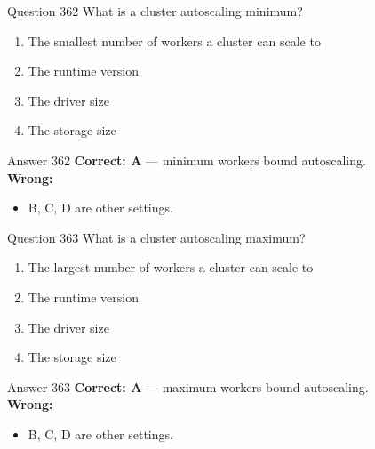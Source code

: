 \documentclass[aspectratio=169,11pt]{beamer}
\begin{document}
	\begin{frame}{Question 362}
		What is a cluster autoscaling minimum?
		\begin{enumerate}[label=\Alph*.]
			\item The smallest number of workers a cluster can scale to
			\item The runtime version
			\item The driver size
			\item The storage size
		\end{enumerate}
	\end{frame}
	\begin{frame}{Answer 362}
		\textbf{Correct: A} --- minimum workers bound autoscaling.\\
		\vspace{0.5em}
		\textbf{Wrong:}
		\begin{itemize}
			\item B, C, D are other settings.
		\end{itemize}
	\end{frame}
	
	\begin{frame}{Question 363}
		What is a cluster autoscaling maximum?
		\begin{enumerate}[label=\Alph*.]
			\item The largest number of workers a cluster can scale to
			\item The runtime version
			\item The driver size
			\item The storage size
		\end{enumerate}
	\end{frame}
	\begin{frame}{Answer 363}
		\textbf{Correct: A} --- maximum workers bound autoscaling.\\
		\vspace{0.5em}
		\textbf{Wrong:}
		\begin{itemize}
			\item B, C, D are other settings.
		\end{itemize}
	\end{frame}
	
\end{document}
